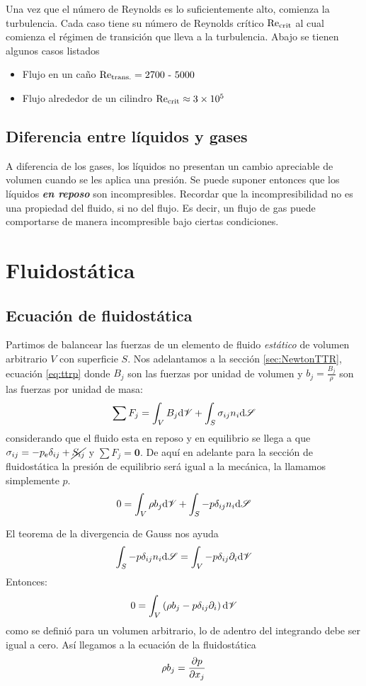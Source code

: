 Una vez que el número de Reynolds es lo suficientemente alto, comienza la turbulencia. Cada caso tiene su número de Reynolds crítico $\textrm{Re}_{\mathrm{crit}}$ al cual comienza el régimen de transición que lleva a la turbulencia. Abajo se tienen algunos casos listados
\begin{itemize}
    \item Flujo en un caño $\textrm{Re}_\textrm{trans.}=2700\mbox{ - }5000$
    \item Flujo alrededor de un cilindro $\textrm{Re}_{\mathrm{crit}} \approx \num{3e5}$
\end{itemize}

\subsection{Diferencia entre líquidos y gases}
A diferencia de los gases, los líquidos no presentan un cambio apreciable de volumen cuando se les aplica una presión. Se puede suponer entonces que los líquidos \textbf{\textit{en reposo}} son incompresibles. Recordar que la incompresibilidad no es una propiedad del fluido, si no del flujo. Es decir, un flujo de gas puede comportarse de manera incompresible bajo ciertas condiciones.


\section{Fluidostática}
\subsection{Ecuación de fluidostática}
Partimos de balancear las fuerzas de un elemento de fluido \textit{estático} de volumen arbitrario $V$ con superficie $S$. Nos adelantamos a la sección \ref{sec:NewtonTTR}, ecuación \ref{eq:ttrp} donde $B_j$ son las fuerzas por unidad de volumen y $b_j=\frac{B_j}{\rho}$ son las fuerzas por unidad de masa:
\[
\sum F_j = \int_V B_j \textrm{d} \mathscr{V} + \int_S \sigma_{ij} n_i \textrm{d} \mathscr{S}
\]
considerando que el fluido esta en reposo y en equilibrio se llega a que $\sigma_{ij}=-\pe \delta_{ij}+\cancel{S_{ij}}$ y $\sum F_j=\pmb{0}$. De aquí en adelante para la sección de fluidostática la presión de equilibrio será igual a la mecánica, la llamamos simplemente $p$.
\[
0=\int_V \rho b_j \textrm{d} \mathscr{V} + \int_S -p\delta_{ij}n_i \textrm{d} \mathscr{S}
\]

El teorema de la divergencia de Gauss nos ayuda
\[
\int_S -p\delta_{ij}n_i \textrm{d} \mathscr{S} = \int_V -p \delta_{ij}\partial_i \textrm{d} \mathscr{V}
\]
Entonces:
\[
0=\int_V \left(\rho b_j - p\delta_{ij}\partial_i\right) \textrm{d} \mathscr{V}
\]
como se definió para un volumen arbitrario, lo de adentro del integrando debe ser igual a cero. Así llegamos a la ecuación de la fluidostática
\begin{equation} \label{eq:fluidostatica}
    \rho b_j = \frac{\partial p}{\partial x_j}
\end{equation}

